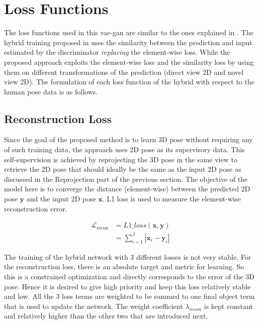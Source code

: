 \section{Loss Functions}
\label{sec:loss_fn}
The loss functions used in this \ac{vae}-\ac{gan} are similar to the ones explained in . The hybrid training proposed in \cite{autoencoding_beyond_pixels} uses the similarity between the prediction and input estimated by the discriminator \textit{replacing} the element-wise loss. While the proposed approach exploits the element-wise loss and the similarity loss by using them on different transformations of the prediction (direct view 2D and novel view 2D). The formulation of each loss function of the hybrid with respect to the human pose data is as follows.

\subsection{Reconstruction Loss}
Since the goal of the proposed method is to learn 3D pose without requiring any of such training data, the approach uses 2D pose as its supervisory data. This self-supervision is achieved by reprojecting the 3D pose in the same view to retrieve the 2D pose that should ideally be the same as the input 2D pose as discussed in the Reprojection  part of the previous section. The objective of the model here is to converge the distance (element-wise) between the predicted 2D pose $\textbf{y}$ and the input 2D pose $\textbf{x}$. L1 loss is used to measure the element-wise reconstruction error.

\begin{equation} \label{eqn:loss_recon}
    \begin{split}
        \mathcal{L}_{\text {recon}}  & = L1\_loss(\textbf{x}, \textbf{y}) \\
        & = \sum_{i=1}^J |\textbf{x}_i - \textbf{y}_i|
    \end{split}
\end{equation}

The training of the hybrid network with 3 different losses is not very stable. For the reconstruction loss, there is an absolute target and metric for learning. So this is a constrained optimization and directly corresponds to the error of the 3D pose. Hence it is desired to give high priority and keep this loss relatively stable and low. All the 3 loss terms are weighted to be summed to one final object term that is used to update the network. The weight coefficient $\lambda_{recon}$ is kept constant and relatively higher than the other two that are introduced next.

